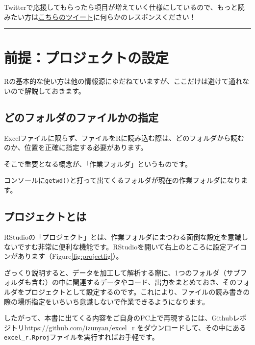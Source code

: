 \documentclass[
  xelatex,ja=standard, b5paper]{bxjsbook}
\begin{document}
Twitterで応援してもらったら項目が増えていく仕様にしているので、もっと読みたい方は\href{https://twitter.com/matsuchiy/status/1277621662708453377}{こちらのツイート}に何らかのレスポンスください！

\begin{center}\rule{0.5\linewidth}{0.5pt}\end{center}

\hypertarget{project}{%
\chapter{前提：プロジェクトの設定}\label{project}}

Rの基本的な使い方は他の情報源にゆだねていますが、ここだけは避けて通れないので解説しておきます。

\hypertarget{ux3069ux306eux30d5ux30a9ux30ebux30c0ux306eux30d5ux30a1ux30a4ux30ebux304bux306eux6307ux5b9a}{%
\section{どのフォルダのファイルかの指定}\label{ux3069ux306eux30d5ux30a9ux30ebux30c0ux306eux30d5ux30a1ux30a4ux30ebux304bux306eux6307ux5b9a}}

Excelファイルに限らず、ファイルをRに読み込む際は、どのフォルダから読むのか、位置を正確に指定する必要があります。

そこで重要となる概念が、「作業フォルダ」というものです。

コンソールに\texttt{getwd()}と打って出てくるフォルダが現在の作業フォルダになります。

\hypertarget{projecttoha}{%
\section{プロジェクトとは}\label{projecttoha}}

RStudioの「プロジェクト」とは、作業フォルダにまつわる面倒な設定を意識しないですむ非常に便利な機能です。RStudioを開いて右上のところに設定アイコンがあります（Figure\ref{fig:projectfig}）。

ざっくり説明すると、データを加工して解析する際に、1つのフォルダ（サブフォルダも含む）の中に関連するデータやコード、出力をまとめておき、そのフォルダをプロジェクトとして設定するのです。これにより、ファイルの読み書きの際の場所指定をいちいち意識しないで作業できるようになります。

したがって、本書に出てくる内容をご自身のPC上で再現するには、Githubレポジトリhttps://github.com/izunyan/excel\_r をダウンロードして、その中にある\texttt{excel\_r.Rproj}ファイルを実行すればお手軽です。
\end{document}
